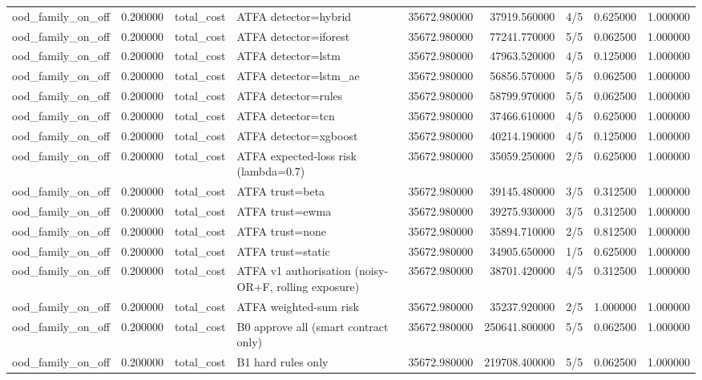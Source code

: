 \begin{tabular}{lrllrrlrr}
ood\_family\_on\_off & 0.200000 & total\_cost & ATFA detector=hybrid & 35672.980000 & 37919.560000 & 4/5 & 0.625000 & 1.000000 \\
ood\_family\_on\_off & 0.200000 & total\_cost & ATFA detector=iforest & 35672.980000 & 77241.770000 & 5/5 & 0.062500 & 1.000000 \\
ood\_family\_on\_off & 0.200000 & total\_cost & ATFA detector=lstm & 35672.980000 & 47963.520000 & 4/5 & 0.125000 & 1.000000 \\
ood\_family\_on\_off & 0.200000 & total\_cost & ATFA detector=lstm\_ae & 35672.980000 & 56856.570000 & 5/5 & 0.062500 & 1.000000 \\
ood\_family\_on\_off & 0.200000 & total\_cost & ATFA detector=rules & 35672.980000 & 58799.970000 & 5/5 & 0.062500 & 1.000000 \\
ood\_family\_on\_off & 0.200000 & total\_cost & ATFA detector=tcn & 35672.980000 & 37466.610000 & 4/5 & 0.625000 & 1.000000 \\
ood\_family\_on\_off & 0.200000 & total\_cost & ATFA detector=xgboost & 35672.980000 & 40214.190000 & 4/5 & 0.125000 & 1.000000 \\
ood\_family\_on\_off & 0.200000 & total\_cost & ATFA expected-loss risk (lambda=0.7) & 35672.980000 & 35059.250000 & 2/5 & 0.625000 & 1.000000 \\
ood\_family\_on\_off & 0.200000 & total\_cost & ATFA trust=beta & 35672.980000 & 39145.480000 & 3/5 & 0.312500 & 1.000000 \\
ood\_family\_on\_off & 0.200000 & total\_cost & ATFA trust=ewma & 35672.980000 & 39275.930000 & 3/5 & 0.312500 & 1.000000 \\
ood\_family\_on\_off & 0.200000 & total\_cost & ATFA trust=none & 35672.980000 & 35894.710000 & 2/5 & 0.812500 & 1.000000 \\
ood\_family\_on\_off & 0.200000 & total\_cost & ATFA trust=static & 35672.980000 & 34905.650000 & 1/5 & 0.625000 & 1.000000 \\
ood\_family\_on\_off & 0.200000 & total\_cost & ATFA v1 authorisation (noisy-OR+F, rolling exposure) & 35672.980000 & 38701.420000 & 4/5 & 0.312500 & 1.000000 \\
ood\_family\_on\_off & 0.200000 & total\_cost & ATFA weighted-sum risk & 35672.980000 & 35237.920000 & 2/5 & 1.000000 & 1.000000 \\
ood\_family\_on\_off & 0.200000 & total\_cost & B0 approve all (smart contract only) & 35672.980000 & 250641.800000 & 5/5 & 0.062500 & 1.000000 \\
ood\_family\_on\_off & 0.200000 & total\_cost & B1 hard rules only & 35672.980000 & 219708.400000 & 5/5 & 0.062500 & 1.000000 \\

\end{tabular}

